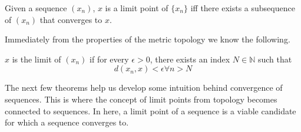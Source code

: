   \begin{lemma}
    Given a sequence $(x_n)$, $x$ is a limit point of $\{x_n\}$ iff there exists a subsequence of $(x_n)$ that converges to $x$. 
  \end{lemma}

  Immediately from the properties of the metric topology we know the following. 

  \begin{definition}
    $x$ is the limit of $(x_n)$ if for every $\epsilon>0$, there exists an index $N \in \mathbb{N}$ such that
    \begin{equation}
      d(x_n, x) < \epsilon \forall n > N
    \end{equation}
  \end{definition}

  The next few theorems help us develop some intuition behind convergence of sequences. This is where the concept of limit points from topology becomes connected to sequences. In here, a limit point of a sequence is a viable candidate for which a sequence converges to. 

